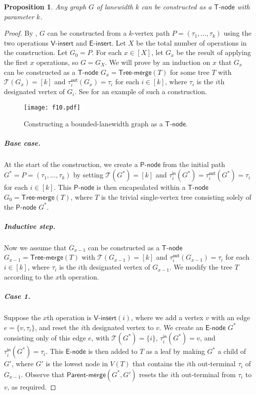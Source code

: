 \documentclass[11pt]{article}
\newtheorem{proposition}[lemma]{Proposition}
\theoremstyle{definition}
\theoremstyle{remark}
\newcommand{\tin}{\tau^{\mathsf{in}}}
\newcommand{\tout}{\tau^{\mathsf{out}}}
\newcommand{\insv}{\mathsf{V}\text{-}\mathsf{insert}}
\newcommand{\inse}{\mathsf{E}\text{-}\mathsf{insert}}
\newcommand{\tmerge}{\mathsf{Tree}\text{-}\mathsf{merge}}
\newcommand{\pmerge}{\mathsf{Parent}\text{-}\mathsf{merge}}
\newcommand{\enode}{\mathsf{E}\text{-}\mathsf{node}}
\newcommand{\pnode}{\mathsf{P}\text{-}\mathsf{node}}
\newcommand{\tnode}{\mathsf{T}\text{-}\mathsf{node}}
\begin{document}
\begin{proposition}\label{prop:recursive}
Any graph $G$ of lanewidth $k$ can be constructed as a $\tnode$ with parameter $k$.
\end{proposition}
\begin{proof}
By , $G$ can be constructed from a $k$-vertex path $P = (\tau_1, \ldots, \tau_k)$ using the two operations $\insv$ and $\inse$. Let $X$ be the total number of operations in the construction. Let $G_0 = P$. For each $x \in [X]$, let $G_x$ be the result of applying the first $x$ operations, so $G = G_X$. We will prove by an induction on $x$ that $G_x$ can be constructed as a $\tnode$ $G_x = \tmerge(T)$ for some tree $T$ with $\mathcal{T}(G_x) = [k]$ and $\tout_i(G_x)=\tau_i$ for each $i \in [k]$, where $\tau_i$ is the $i$th designated vertex of $G_i$. See  for an example of such a construction.

\begin{figure}[ht!]
    \centering
    \texttt{[image: f10.pdf]}
    \caption{Constructing a bounded-lanewidth graph as a  $\tnode$.}
    \label{fig:f10}
\end{figure}


\subparagraph{Base case.} At the start of the construction, we create a $\pnode$ from the initial path $G^\ast = P = (\tau_1, \ldots, \tau_k)$ by setting $\mathcal{T}(G^\ast) = [k]$ and $\tin_i(G^\ast)=\tout_i(G^\ast)=\tau_i$ for each $i \in [k]$. This $\pnode$ is then encapsulated within a $\tnode$ $G_0 = \tmerge(T)$, where $T$ is the trivial single-vertex tree consisting solely of the $\pnode$ $G^\ast$.

\subparagraph{Inductive step.} Now we assume that $G_{x-1}$ can be constructed as a $\tnode$ $G_{x-1} = \tmerge(T)$ with $\mathcal{T}(G_{x-1}) = [k]$ and $\tout_i(G_{x-1})=\tau_i$ for each $i \in [k]$, where $\tau_i$ is the $i$th designated vertex of $G_{x-1}$. We modify the tree $T$ according to the $x$th operation.

\subparagraph{Case 1.} Suppose the $x$th operation is $\insv(i)$, where we add a vertex $v$ with an edge $e = \{v, \tau_i\}$, and reset the $i$th designated vertex to $v$. We create an $\enode$ $G^\ast$ consisting only of this edge $e$, with $\mathcal{T}(G^\ast) = \{i\}$, $\tin_i(G^\ast) = v$, and $\tin_i(G^\ast) = \tau_i$. This $\enode$ is then added to $T$ as a leaf by making $G^\ast$ a child of $G'$, where $G'$ is the lowest node in $V(T)$ that contains the $i$th out-terminal $\tau_i$ of $G_{x-1}$. Observe that $\pmerge(G^\ast, G')$ resets the $i$th out-terminal from $\tau_i$ to $v$, as required.


\end{proof}
\end{document}
